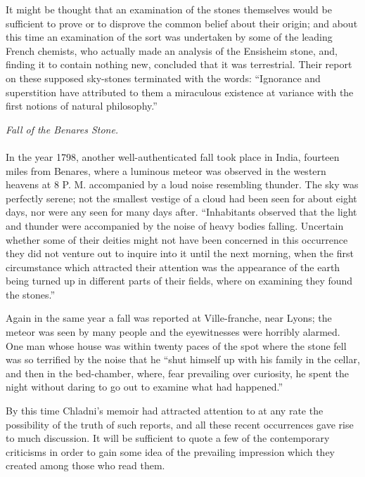 \documentclass[a4paper, 12pt, oneside]{article}
\begin{document}
It might be thought that an examination of the stones themselves would be sufficient to prove or to disprove the common belief about their origin; and about this time an examination of the sort was undertaken by some of the leading French chemists, who actually made an analysis of the Ensisheim stone, and, finding it to contain nothing new, concluded that it was terrestrial. Their report on these supposed sky-stones terminated with the words: ``Ignorance and superstition have attributed to them a miraculous existence at variance with the first notions of natural philosophy.'' 
\begin{center}
\emph{Fall of the Benares Stone.}
\end{center}
\paragraph{}
In the year 1798, another well-authenticated fall took place in India, fourteen miles from Benares, where a luminous meteor was observed in the western heavens at 8 P. M. accompanied by a loud noise resembling thunder. The sky was perfectly serene; not the smallest vestige of a cloud had been seen for about eight days, nor were any seen for many days after. ``Inhabitants observed that the light and thunder were accompanied by the noise of heavy bodies falling. Uncertain whether some of their deities might not have been concerned in this occurrence they did not venture out to inquire into it until the next morning, when the first circumstance which attracted their attention was the appearance of the earth being turned up in different parts of their fields, where on examining they found the stones.'' 

Again in the same year a fall was reported at Ville-franche, near Lyons; the meteor was seen by many people and the eyewitnesses were horribly alarmed. One man whose house was within twenty paces of the spot where the stone fell was so terrified by the noise that he ``shut himself up with his family in the cellar, and then in the bed-chamber, where, fear prevailing over curiosity, he spent the night without daring to go out to examine what had happened.'' 

By this time Chladni's memoir had attracted attention to at any rate the possibility of the truth of such reports, and all these recent occurrences gave rise to much discussion. It will be sufficient to quote a few of the contemporary criticisms in order to gain some idea of the prevailing impression which they created among those who read them. 
\end{document}
